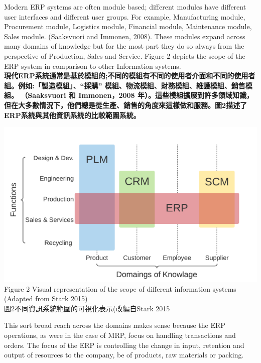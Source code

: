 \documentclass[24pt]{article} %
\begin{document}
Modern ERP systems are often module based; different modules have different user interfaces and different user groups. For example, Manufacturing module, Procurement module, Logistics module, Financial module, Maintenance module, Sales module. (Saaksvuori and Immonen, 2008). These modules expand across many domains of knowledge but for the most part they do so always from the perspective of Production, Sales and Service. Figure 2 depicts the scope of the ERP system in comparison to other Information systems.\\

\textbf{現代ERP系統通常是基於模組的;不同的模組有不同的使用者介面和不同的使用者組。例如:「製造模組」、“採購” 模組、物流模組、財務模組、維護模組、銷售模組。 （Saaksvuori 和 Immonen，2008 年）。這些模組擴展到許多領域知識，但在大多數情況下，他們總是從生產、銷售的角度來這樣做和服務。圖2描述了ERP系統與其他資訊系統的比較範圍系統。}\\

\begin{center}
\includegraphics[width=15cm]{2.png}\\

Figure 2 Visual representation of the scope of different information systems (Adapted from Stark 2015)\\

圖2不同資訊系統範圍的可視化表示(改編自Stark 2015\\

\end{center}

This sort broad reach across the domains makes sense because the ERP operations, as were in the case of MRP, focus on handling transactions and orders. The focus of the ERP is controlling the change in input, retention and output of resources to the company, be of products, raw materials or packing.\\
\end{document}
